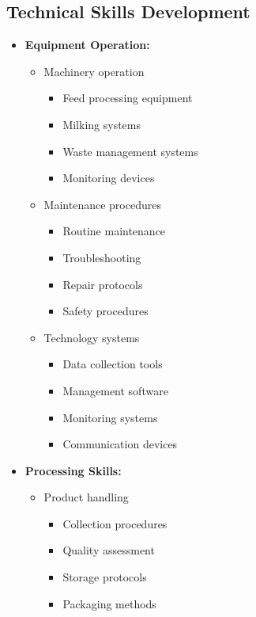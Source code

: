 \subsection{Technical Skills Development}
\begin{itemize}
    \item \textbf{Equipment Operation:}
    \begin{itemize}
        \item Machinery operation
        \begin{itemize}
            \item Feed processing equipment
            \item Milking systems
            \item Waste management systems
            \item Monitoring devices
        \end{itemize}
        
        \item Maintenance procedures
        \begin{itemize}
            \item Routine maintenance
            \item Troubleshooting
            \item Repair protocols
            \item Safety procedures
        \end{itemize}
        
        \item Technology systems
        \begin{itemize}
            \item Data collection tools
            \item Management software
            \item Monitoring systems
            \item Communication devices
        \end{itemize}
    \end{itemize}
    
    \item \textbf{Processing Skills:}
    \begin{itemize}
        \item Product handling
        \begin{itemize}
            \item Collection procedures
            \item Quality assessment
            \item Storage protocols
            \item Packaging methods
        \end{itemize}
        

\end{itemize}
\end{itemize}
